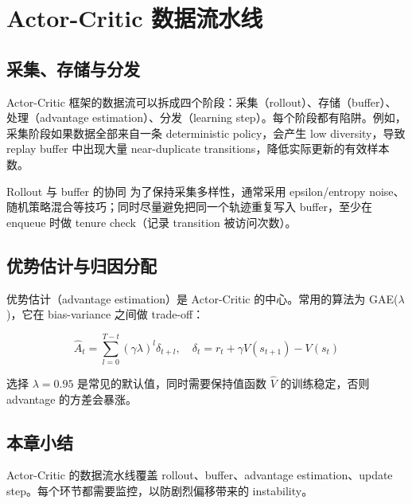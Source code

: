 \section{Actor-Critic 数据流水线}

\subsection{采集、存储与分发}

Actor-Critic 框架的数据流可以拆成四个阶段：采集（rollout）、存储（buffer）、处理（advantage estimation）、分发（learning step）。每个阶段都有陷阱。例如，采集阶段如果数据全部来自一条 deterministic policy，会产生 low diversity，导致 replay buffer 中出现大量 near-duplicate transitions，降低实际更新的有效样本数。

\begin{knowledgebox}{Rollout 与 buffer 的协同}
为了保持采集多样性，通常采用 epsilon/entropy noise、随机策略混合等技巧；同时尽量避免把同一个轨迹重复写入 buffer，至少在 enqueue 时做 tenure check（记录 transition 被访问次数）。
\end{knowledgebox}

\subsection{优势估计与归因分配}

优势估计（advantage estimation）是 Actor-Critic 的中心。常用的算法为 GAE($\lambda$)，它在 bias-variance 之间做 trade-off：

$$\hat{A}_t = \sum_{l=0}^{T-t}(\gamma \lambda)^l \delta_{t+l},\quad \delta_t = r_t + \gamma V(s_{t+1}) - V(s_t)$$

选择 $\lambda=0.95$ 是常见的默认值，同时需要保持值函数 $\hat{V}$ 的训练稳定，否则 advantage 的方差会暴涨。

\subsection{本章小结}

Actor-Critic 的数据流水线覆盖 rollout、buffer、advantage estimation、update step。每个环节都需要监控，以防剧烈偏移带来的 instability。

